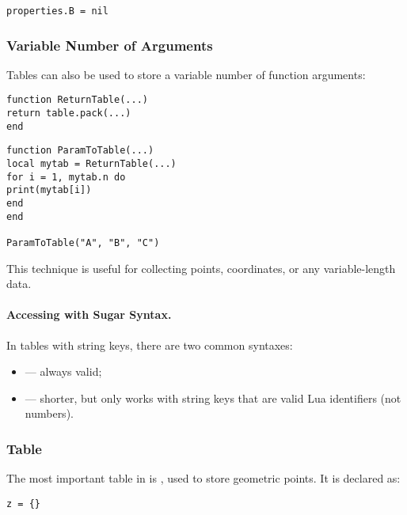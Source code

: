 \begin{verbatim}
properties.B = nil
\end{verbatim}


\subsubsection{Variable Number of Arguments}

Tables can also be used to store a variable number of function arguments:

\begin{mybox}
\begin{verbatim}
function ReturnTable(...)
return table.pack(...)
end
\end{verbatim}
\end{mybox}

\begin{mybox}
\begin{verbatim}
function ParamToTable(...)
local mytab = ReturnTable(...)
for i = 1, mytab.n do
print(mytab[i])
end
end

ParamToTable("A", "B", "C")
\end{verbatim}
\end{mybox}

This technique is useful for collecting points, coordinates, or any variable-length data.

\paragraph{Accessing with Sugar Syntax.}
In tables with string keys, there are two common syntaxes:

\begin{itemize}
\item {} — always valid;
\item {} — shorter, but only works with string keys that are valid Lua identifiers (not numbers).
\end{itemize}

\subsubsection{Table }

The most important table in  is , used to store geometric points. It is declared as:

\begin{verbatim}
z = {}
\end{verbatim}

